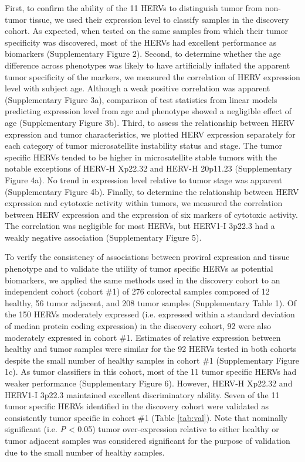 First, to confirm the ability of the 11 HERVs to distinguish tumor from non-tumor tissue, we used their expression level to classify samples in the discovery cohort.
As expected, when tested on the same samples from which their tumor specificity was discovered, most of the HERVs had excellent performance as biomarkers (Supplementary Figure 2).
Second, to determine whether the age difference across phenotypes was likely to have artificially inflated the apparent tumor specificity of the markers, we measured the correlation of HERV expression level with subject age.
Although a weak positive correlation was apparent (Supplementary Figure 3a), comparison of test statistics from linear models predicting expression level from age and phenotype showed a negligible effect of age (Supplementary Figure 3b).
Third, to assess the relationship between HERV expression and tumor characteristics, we plotted HERV expression separately for each category of tumor microsatellite instability status and stage.
The tumor specific HERVs tended to be higher in microsatellite stable tumors with the notable exceptions of HERV-H Xp22.32 and HERV-H 20p11.23 (Supplementary Figure 4a).
No trend in expression level relative to tumor stage was apparent (Supplementary Figure 4b).
Finally, to determine the relationship between HERV expression and cytotoxic activity within tumors, we measured the correlation between HERV expression and the expression of six markers of cytotoxic activity.
The correlation was negligible for most HERVs, but HERV1-I 3p22.3 had a weakly negative association (Supplementary Figure 5).

To verify the consistency of associations between proviral expression and tissue phenotype and to validate the utility of tumor specific HERVs as potential biomarkers, we applied the same methods used in the discovery cohort to an independent cohort (cohort \#1) of 276 colorectal samples composed of 12 healthy, 56 tumor adjacent, and 208 tumor samples (Supplementary Table 1).
Of the 150 HERVs moderately expressed (i.e. expressed within a standard deviation of median protein coding expression) in the discovery cohort, 92 were also moderately expressed in cohort \#1.
Estimates of relative expression between healthy and tumor samples were similar for the 92 HERVs tested in both cohorts despite the small number of healthy samples in cohort \#1 (Supplementary Figure 1c).
As tumor classifiers in this cohort, most of the 11 tumor specific HERVs had weaker performance (Supplementary Figure 6).
However, HERV-H Xp22.32 and HERV1-I 3p22.3 maintained excellent discriminatory ability.
Seven of the 11 tumor specific HERVs identified in the discovery cohort were validated as consistently tumor specific in cohort \#1 (Table \ref{tab:val}).
Note that nominally significant (i.e. \emph{P} < 0.05) tumor over-expression relative to either healthy or tumor adjacent samples was considered significant for the purpose of validation due to the small number of healthy samples.

